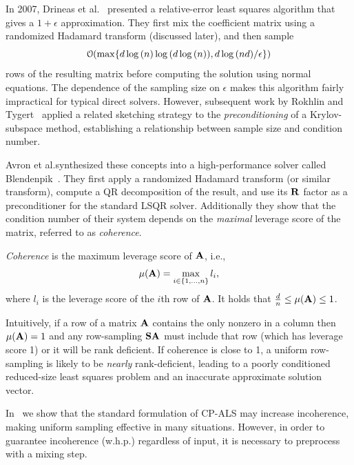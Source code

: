 In 2007, Drineas et al.~\cite{DrMaMuSa11} presented a relative-error
least squares algorithm that gives a $1 + \epsilon$
approximation. They first mix the coefficient matrix using a
randomized Hadamard transform (discussed later), and then sample 
\begin{equation}
\label{eqn:numsamples}
\mathcal{O}\hspace{-.2em}\left({\max\{ d\log{(n)}\log{(d\log{(n)})}, d\log{(nd)}/\epsilon\}}\right)
\end{equation}
rows of the resulting matrix before computing the solution using
normal equations. The dependence of the sampling size on $\epsilon$
makes this algorithm fairly impractical for typical direct
solvers. However, subsequent work by Rokhlin and
Tygert~\cite{rokhlintygert} applied a related sketching strategy to
the \emph{preconditioning} of a Krylov-subspace method, establishing a
relationship between sample size and condition number.  

Avron et al.\@ synthesized these concepts into a high-performance
solver called Blendenpik~\cite{blendenpik}. They first apply a
randomized Hadamard transform (or similar transform),
compute a QR decomposition of the result, and use its
$\M{R}$ factor as a preconditioner
for the standard LSQR solver. Additionally they show that the
condition number of their system depends on the \emph{maximal}
leverage score of the matrix, referred to as \emph{coherence}. 
\begin{definition}
\emph{Coherence} is  the maximum leverage score of $\M{A}$, i.e.,
\[ \mu(\M{A}) = \max_{i \in \{1,\dots,n\}} l_i, \]
where $l_i$ is the leverage score of the $i$th row of $\M{A}$. It
holds that $\frac{d}{n} \leq \mu(\M{A}) \leq 1$. 
\end{definition}
Intuitively, if a row of a matrix $\M{A}$ contains the only nonzero in a column then $\mu(\M{A})=1$ and any row-sampling $\M{SA}$ must include that row (which has leverage score 1) or it will be rank deficient. If coherence is close to 1, a uniform row-sampling is likely to be \emph{nearly} rank-deficient, leading to a poorly conditioned reduced-size least squares problem and an inaccurate approximate solution vector. 

In~\cite{caseyb} we show that the standard formulation of CP-ALS
may increase incoherence, making uniform sampling effective in many
situations. However, in order to guarantee incoherence (w.h.p.)
regardless of input, it is necessary to preprocess with a mixing step.  

